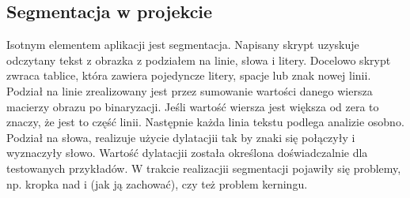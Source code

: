 \subsection{Segmentacja w projekcie}
    Isotnym elementem aplikacji jest segmentacja. Napisany skrypt uzyskuje odczytany tekst z obrazka z podziałem na linie, słowa i litery. Docelowo skrypt zwraca tablice, która zawiera pojedyncze litery, spacje lub znak nowej linii.
    Podział na linie zrealizowany jest przez sumowanie wartości danego wiersza macierzy obrazu po binaryzacji. Jeśli wartość wiersza jest większa od zera to znaczy, że jest to część linii.
    Następnie każda linia tekstu podlega analizie osobno. Podział na słowa, realizuje użycie dylatacjii tak by znaki się połączyły i wyznaczyły słowo. Wartość dylatacjii została określona doświadczalnie dla testowanych przykładów.
    W trakcie realizacjii segmentacji pojawiły się problemy, np. kropka nad i (jak ją zachować), czy też problem kerningu.